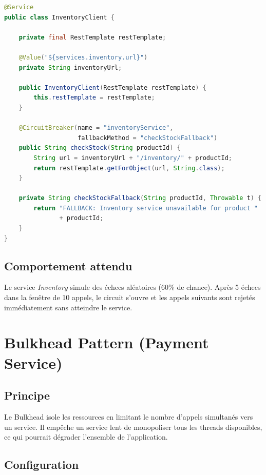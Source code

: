 \documentclass[11pt,a4paper]{article}
\begin{document}
\begin{lstlisting}[language=Java, caption={InventoryClient.java}]
@Service
public class InventoryClient {

    private final RestTemplate restTemplate;

    @Value("${services.inventory.url}")
    private String inventoryUrl;

    public InventoryClient(RestTemplate restTemplate) {
        this.restTemplate = restTemplate;
    }

    @CircuitBreaker(name = "inventoryService",
                    fallbackMethod = "checkStockFallback")
    public String checkStock(String productId) {
        String url = inventoryUrl + "/inventory/" + productId;
        return restTemplate.getForObject(url, String.class);
    }

    private String checkStockFallback(String productId, Throwable t) {
        return "FALLBACK: Inventory service unavailable for product "
               + productId;
    }
}
\end{lstlisting}

\subsection*{Comportement attendu}
Le service \textit{Inventory} simule des échecs aléatoires (60\% de chance). Après 5 échecs dans la fenêtre de 10 appels, le circuit s'ouvre et les appels suivants sont rejetés immédiatement sans atteindre le service.

\section{Bulkhead Pattern (Payment Service)}

\subsection*{Principe}

Le Bulkhead isole les ressources en limitant le nombre d'appels simultanés vers un service. Il empêche un service lent de monopoliser tous les threads disponibles, ce qui pourrait dégrader l'ensemble de l'application.

\subsection*{Configuration}
\end{document}
